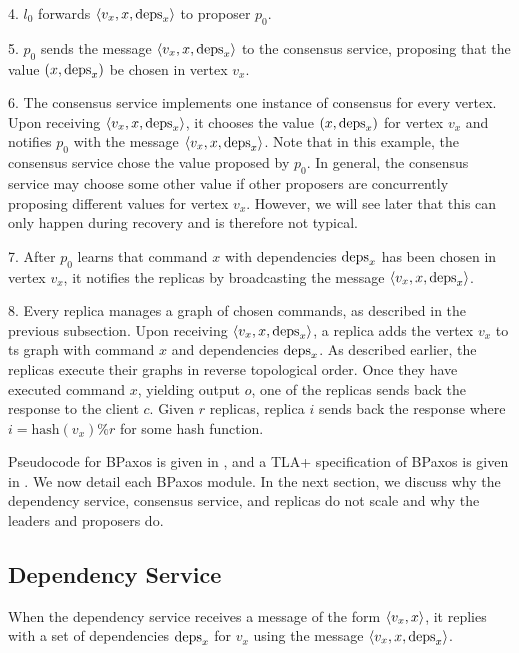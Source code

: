 4. $l_0$ forwards $\langle v_x, x, \text{deps}_x \rangle$ to proposer $p_0$.

5. $p_0$ sends the message $\langle v_x, x, \text{deps}_x \rangle$ to the consensus service,
proposing that the value $(x, \text{deps}_x)$ be chosen in vertex $v_x$.

6. The consensus service implements one instance of consensus for every vertex.
Upon receiving $\langle v_x, x, \text{deps}_x \rangle$, it chooses the value $(x, \text{deps}_x)$
for vertex $v_x$ and notifies $p_0$ with the message $\langle v_x, x, \text{deps}_x \rangle$.
Note that in this example, the consensus service chose the value proposed by
$p_0$. In general, the consensus service may choose some other value if other
proposers are concurrently proposing different values for vertex $v_x$.
However, we will see later that this can only happen during recovery and is
therefore not typical.

7. After $p_0$ learns that command $x$ with dependencies $\text{deps}_x$ has been
chosen in vertex $v_x$, it notifies the replicas by broadcasting the message
$\langle v_x, x, \text{deps}_x \rangle$.

8. Every replica manages a graph of chosen commands, as described in the
previous subsection. Upon receiving $\langle v_x, x, \text{deps}_x \rangle$, a replica adds
the vertex $v_x$ to ts graph with command $x$ and dependencies $\text{deps}_x$.
As described earlier, the replicas execute their graphs in reverse topological
order. Once they have executed command $x$, yielding output $o$, one of the
replicas sends back the response to the client $c$. Given $r$ replicas, replica
$i$ sends back the response where $i = \text{hash}(v_x) \% r$ for some hash
function.

Pseudocode for BPaxos is given in , and a TLA+
specification of BPaxos is given in . We now detail each BPaxos
module. In the next section, we discuss why the dependency service, consensus
service, and replicas do not scale and why the leaders and proposers do.

{}
{}

\subsection{Dependency Service}
When the dependency service receives a message of the form $\langle v_x, x \rangle$, it
replies with a set of dependencies $\text{deps}_x$ for $v_x$ using the message
$\langle v_x, x, \text{deps}_x \rangle$.

